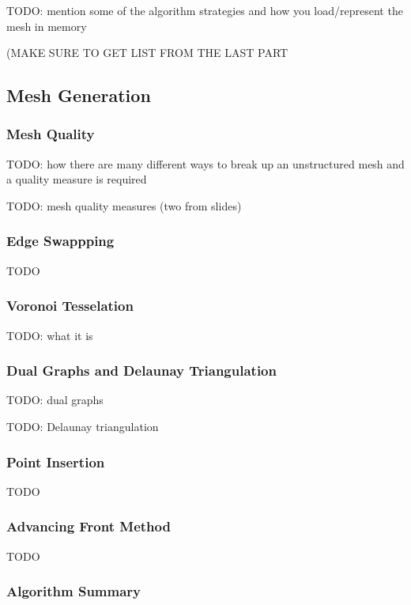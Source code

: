 \documentclass{article}
\begin{document}
TODO: mention some of the algorithm strategies and how you load/represent the mesh in memory

(MAKE SURE TO GET LIST  FROM THE LAST PART

\subsection{Mesh Generation}

\subsubsection{Mesh Quality}

TODO: how there are many different ways to break up an unstructured mesh and a quality measure is required

TODO: mesh quality measures (two from slides)

\subsubsection{Edge Swappping}

TODO

\subsubsection{Voronoi Tesselation}

TODO: what it is

\subsubsection{Dual Graphs and Delaunay Triangulation}

TODO: dual graphs

TODO: Delaunay triangulation

\subsubsection{Point Insertion}

TODO

\subsubsection{Advancing Front Method}

TODO

\subsubsection{Algorithm Summary}
\end{document}
